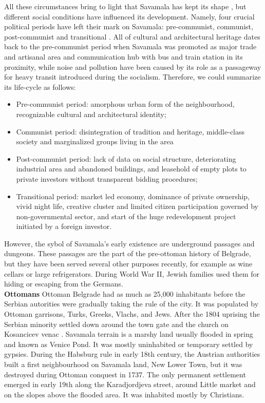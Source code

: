 \documentclass[11pt]{report}
\begin{document}
All these circumstances bring to light that Savamala has kept its shape , but different social conditions have influenced its development. Namely, four crucial political periods have left their mark on Savamala: pre-communist, communist, post-communist and transitional . All of cultural and architectural heritage dates back to the pre-communist period when Savamala was promoted as major trade and artisanal area and communication hub with bus and train station in its proximity, while noise and pollution have been caused by its role as a passageway for heavy transit introduced during the socialism. Therefore, we could summarize its life-cycle as follows:
\begin{itemize}
\item Pre-communist period: amorphous urban form of the neighbourhood, recognizable cultural and architectural identity;
\item Communist period: disintegration of tradition and heritage, middle-class society and marginalized groups living in the area
\item Post-communist period: lack of data on social structure, deteriorating industrial area and abandoned buildings, and leasehold of empty plots to private investors without transparent bidding procedures;
\item Transitional period: market led economy, dominance of private ownership, vivid night life, creative cluster and limited citizen participation governed by non-governmental sector, and start of the huge redevelopment project initiated by a foreign  investor.
\end{itemize}
However, the sybol of Savamala's early existence are underground passages and dungeons. These passages are the part of the pre-ottoman history of Belgrade, but they have been served several other purposes recently, for example as wine cellars or large refrigerators. During World War II, Jewish families used them for hiding or escaping from the Germans.
\\
\textbf{Ottomans}
Ottoman Belgrade had as much as 25,000 inhabitants before the Serbian autorities were gradually taking the rule of the city. It was populated by Ottoman garrisons, Turks, Greeks, Vlachs, and Jews. After the 1804 uprising the Serbian minority settled down around the town gate and the church on Kosancicev venac \cite{Roter Blagojevic in Doytchinov 2015}.
Savamala terrain is a marshy land usually flooded in spring and known as Venice Pond. It was mostly uninhabited or temporary settled by gypsies. During the Habsburg rule in early 18th century, the Austrian authorities built a first neighbourhood on Savamala land, New Lower Town, but it was destroyed during Ottoman conquest in 1737. The only permanent settlement emerged in early 19th along the Karadjordjeva street, around Little market and on the slopes above the flooded area. It was inhabited mostly by Christians.
\end{document}
